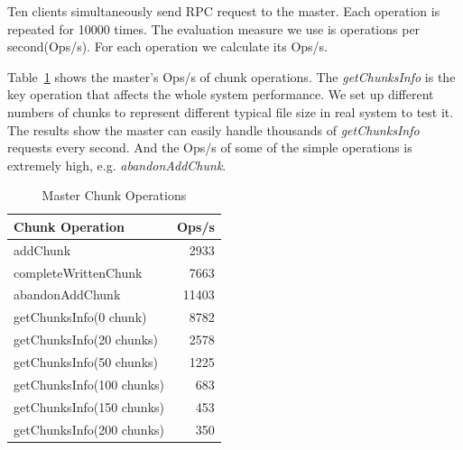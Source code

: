 \documentclass[letterpaper,twocolumn,10pt]{article}
\begin{document}
Ten clients simultaneously send RPC request to the master. Each operation is repeated for 10000 times. The evaluation measure we use is operations per second(Ops/s). For each operation we calculate its Ops/s. 

Table~\ref{tab:chunkop} shows the master's Ops/s of chunk operations. The \emph{getChunksInfo} is the key operation that affects the whole system performance. We set up different numbers of chunks to represent different typical file size in real system to test it. The results show the master can easily handle thousands of \emph{getChunksInfo} requests every second. And the Ops/s of some of the simple operations is extremely high, e.g. \emph{abandonAddChunk}. 
\begin{table}
  \centering
  \begin{tabular}{l|r}\toprule[1.5pt]
    Chunk Operation&Ops/s\\ \midrule
    addChunk&2933\\ \midrule
    completeWrittenChunk&7663\\ \midrule
    abandonAddChunk&11403\\ \midrule
    getChunksInfo(0 chunk)&8782\\ \midrule
    getChunksInfo(20 chunks)&2578\\ \midrule
    getChunksInfo(50 chunks)&1225\\ \midrule
    getChunksInfo(100 chunks)&683\\ \midrule
    getChunksInfo(150 chunks)&453\\ \midrule
    getChunksInfo(200 chunks)&350\\ \midrule
  \end{tabular}
  \caption{Master Chunk Operations}
  \label{tab:chunkop}
\end{table}
\end{document}
